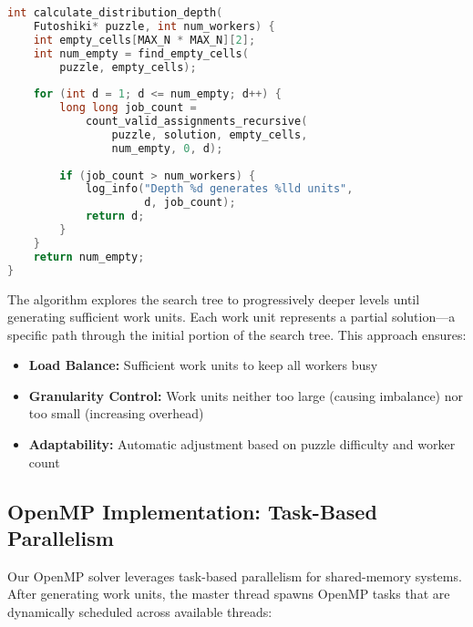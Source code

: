 \documentclass[10pt, conference]{IEEEtran}
\begin{document}
\begin{lstlisting}[language=C, caption=Dynamic depth calculation]
int calculate_distribution_depth(
    Futoshiki* puzzle, int num_workers) {
    int empty_cells[MAX_N * MAX_N][2];
    int num_empty = find_empty_cells(
        puzzle, empty_cells);
    
    for (int d = 1; d <= num_empty; d++) {
        long long job_count = 
            count_valid_assignments_recursive(
                puzzle, solution, empty_cells, 
                num_empty, 0, d);
        
        if (job_count > num_workers) {
            log_info("Depth %d generates %lld units", 
                     d, job_count);
            return d;
        }
    }
    return num_empty;
}
\end{lstlisting}

The algorithm explores the search tree to progressively deeper levels until generating sufficient work units. Each work unit represents a partial solution—a specific path through the initial portion of the search tree. This approach ensures:
\begin{itemize}
    \item \textbf{Load Balance:} Sufficient work units to keep all workers busy
    \item \textbf{Granularity Control:} Work units neither too large (causing imbalance) nor too small (increasing overhead)
    \item \textbf{Adaptability:} Automatic adjustment based on puzzle difficulty and worker count
\end{itemize}

\subsection{OpenMP Implementation: Task-Based Parallelism}
Our OpenMP solver leverages task-based parallelism for shared-memory systems. After generating work units, the master thread spawns OpenMP tasks that are dynamically scheduled across available threads:
\end{document}
